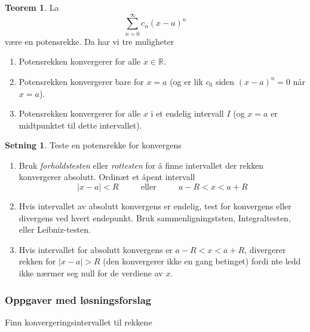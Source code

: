 \documentclass[11pt]{article}
\theoremstyle{definition}
\theoremstyle{definition}
\theoremstyle{definition}
\newtheorem{minset}{Setning}[section]
\newenvironment{fminset}
{\begin{mdframed}[style=minstil]\begin{minset}}
		{\end{minset}\end{mdframed}}
\theoremstyle{definition}
\newtheorem{teo}{Teorem}[section]
\newenvironment{fteo}
{\begin{mdframed}[style=minstil]\begin{teo}}
		{\end{teo}\end{mdframed}}
\theoremstyle{definition}
\theoremstyle{definition}
\begin{document}
		\begin{fteo}
			La \[\sum_{n=0}^{\infty}c_n(x-a)^n \]
			være en potensrekke. Da har vi tre muligheter
			\begin{enumerate}
				\item Potensrekken konvergerer for alle \(x\in \mathbb{R}. \)
				\item Potensrekken konvergerer bare for \(x=a\) (og er lik \(c_0\) siden \((x-a)^n=0\) når \(x=a\)).
				\item Potensrekken konvergerer for alle \(x\) i et endelig intervall \(I\) (og \(x=a\) er midtpunktet til dette intervallet).
			\end{enumerate}
		\end{fteo}
		
		
		\newpage
		
		\begin{fminset} 
			Teste en potensrekke for konvergens 
			
			\begin{enumerate}
				\item Bruk \textit{forholdstesten} eller \textit{rottesten} for å finne intervallet der rekken konvergerer absolutt. Ordinæt et åpent intervall
				\[|x-a|<R\hspace{32pt}\text{eller}\hspace{32pt}a-R<x<a+R\]
				\item Hvis intervallet av absolutt konvergens er endelig, test for konvergens eller divergens ved hvert endepunkt. Bruk sammenligningststen, Integraltesten, eller Leibniz-testen.
				\item Hvis intervallet for absolutt konvergens er \(a-R<x<a+R\), divergerer rekken for \(|x-a|>R\) (den konvergerer ikke en gang betinget) fordi nte ledd ikke nærmer seg null for de verdiene av \(x\).
			\end{enumerate}
			
		\end{fminset}
		
		\newpage
		
		\subsubsection{Oppgaver med løsningsforslag}
		
		Finn konvergeringsintervallet til rekkene
		
\end{document}
